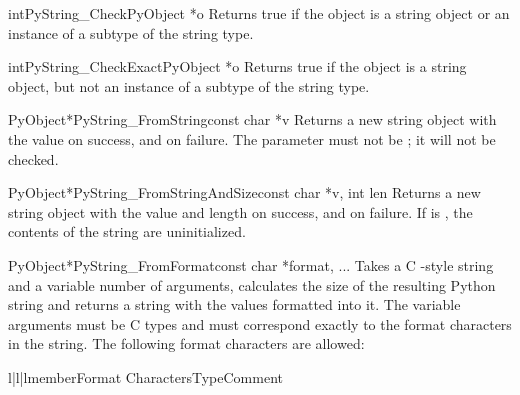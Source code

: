 \begin{cfuncdesc}{int}{PyString_Check}{PyObject *o}
  Returns true if the object  is a string object or an instance
  of a subtype of the string type.
\end{cfuncdesc}

\begin{cfuncdesc}{int}{PyString_CheckExact}{PyObject *o}
  Returns true if the object  is a string object, but not an
  instance of a subtype of the string type.
\end{cfuncdesc}

\begin{cfuncdesc}{PyObject*}{PyString_FromString}{const char *v}
  Returns a new string object with the value  on success, and
  \NULL{} on failure.  The parameter  must not be \NULL; it
  will not be checked.
\end{cfuncdesc}

\begin{cfuncdesc}{PyObject*}{PyString_FromStringAndSize}{const char *v,
                                                         int len}
  Returns a new string object with the value  and length
   on success, and \NULL{} on failure.  If  is
  \NULL, the contents of the string are uninitialized.
\end{cfuncdesc}

\begin{cfuncdesc}{PyObject*}{PyString_FromFormat}{const char *format, ...}
  Takes a C -style  string and a
  variable number of arguments, calculates the size of the resulting
  Python string and returns a string with the values formatted into
  it.  The variable arguments must be C types and must correspond
  exactly to the format characters in the  string.  The
  following format characters are allowed:

  \begin{tableiii}{l|l|l}{member}{Format Characters}{Type}{Comment}
  \end{tableiii}
\end{cfuncdesc}

